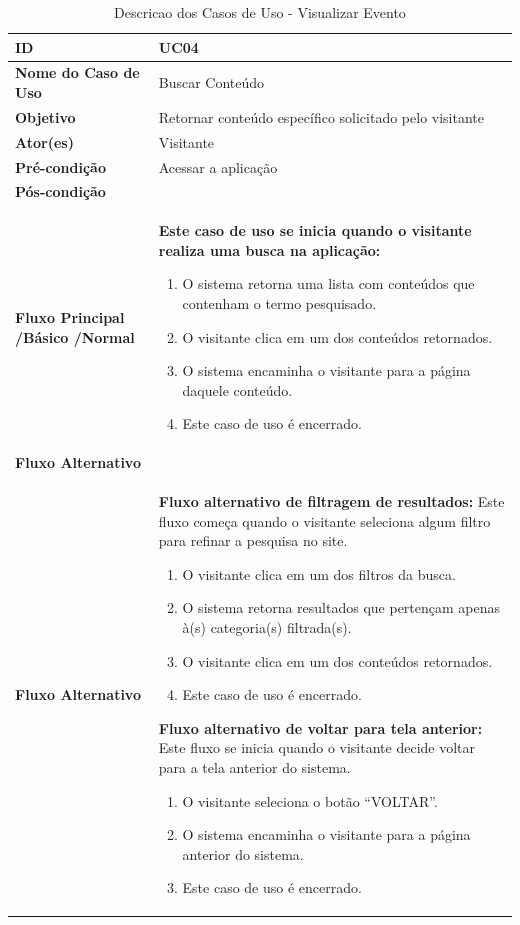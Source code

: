 \begin{table}[t]
\begin{tabular}{| p{6cm} | p{10cm} |}
	\hline
	\textbf{ID} & UC04\tabularnewline
	\hline
	\hline
	\textbf{Nome do Caso de Uso} & Buscar Conteúdo\tabularnewline
	\hline
	\textbf{Objetivo} & Retornar conteúdo específico solicitado pelo visitante\tabularnewline
	\hline
	\textbf{Ator(es)} & Visitante\tabularnewline
	\hline
	\textbf{Pré-condição} & Acessar a aplicação\tabularnewline
	\hline
	\textbf{Pós-condição} & \tabularnewline
	\hline
	\textbf{Fluxo Principal /Básico /Normal} & \textbf{Este caso de uso se inicia quando o visitante realiza uma busca na aplicação:}
	\vspace{0.2cm}
	\begin{enumerate}
		\item O sistema retorna uma lista com conteúdos que contenham o termo pesquisado.
		\item O visitante clica em um dos conteúdos retornados.
		\item O sistema encaminha o visitante para a página daquele conteúdo.
		\item Este caso de uso é encerrado.
	\end{enumerate} \tabularnewline
	\hline
	\textbf{Fluxo Alternativo} & \tabularnewline
	\hline
	\textbf{Fluxo Alternativo} & \textbf{Fluxo alternativo de filtragem de resultados:}
	\vspace{0.2cm}
	Este fluxo começa quando o visitante seleciona algum filtro para refinar a pesquisa no site.
	\begin{enumerate}
		\item O visitante clica em um dos filtros da busca.
		\item O sistema retorna resultados que pertençam apenas à(s) categoria(s) filtrada(s).
		\item O visitante clica em um dos conteúdos retornados.
		\item Este caso de uso é encerrado.
	\end{enumerate}

	\textbf{Fluxo alternativo de voltar para tela anterior:}
	\vspace{0.2cm}
	Este fluxo se inicia quando o visitante decide voltar para a tela anterior do sistema.
	\begin{enumerate}
		\item O visitante seleciona o botão “VOLTAR”.
		\item O sistema encaminha o visitante para a página anterior do sistema.
		\item Este caso de uso é encerrado.
	\end{enumerate} \tabularnewline
	\hline
\end{tabular}
\caption{Descricao dos Casos de Uso - Visualizar Evento}
\label{DCU_Visualizar_Evento}
\end{table}